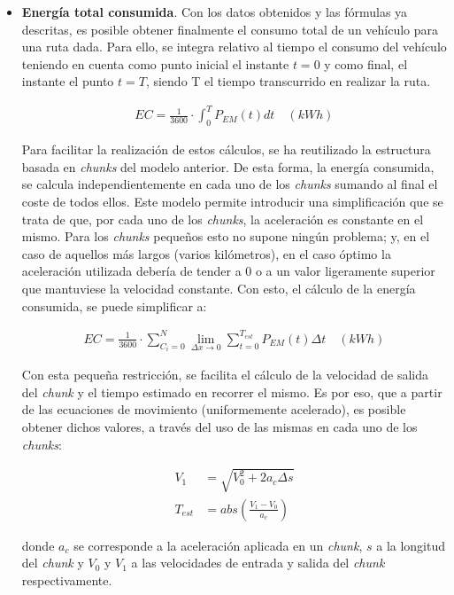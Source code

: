 \documentclass[11pt,spanish,listoffigures,listoftables]{tfgetsinf}
\begin{document}
\begin{itemize}
    \item \textbf{Energía total consumida}. Con los datos obtenidos y las fórmulas ya descritas, es posible obtener finalmente el consumo total de un vehículo para una ruta dada. Para ello, se integra relativo al tiempo el consumo del vehículo teniendo en cuenta como punto inicial el instante $t=0$ y como final, el instante el punto $t=T$, siendo T el tiempo transcurrido en realizar la ruta.
    
    \begin{align}
        EC = \frac{1}{3600} \cdot \int_{0}^{T}{P_{EM}(t)dt} \quad(kWh)
    \end{align}
    
    Para facilitar la realización de estos cálculos, se ha reutilizado la estructura basada en \textit{chunks} del modelo anterior. De esta forma, la energía consumida, se calcula independientemente en cada uno de los \textit{chunks} sumando al final el coste de todos ellos. Este modelo permite introducir una simplificación que se trata de que, por cada uno de los \textit{chunks}, la aceleración es constante en el mismo. Para los \textit{chunks} pequeños esto no supone ningún problema; y, en el caso de aquellos más largos (varios kilómetros), en el caso óptimo la aceleración utilizada debería de tender a 0 o a un valor ligeramente superior que mantuviese la velocidad constante. Con esto, el cálculo de la energía consumida, se puede simplificar a:
    
    \begin{align}
        EC = \frac{1}{3600} \cdot \sum_{C_i=0}^{N} \lim_{\Delta x\to0} \sum_{t=0}^{T_{est}}{P_{EM}(t)\Delta t} \quad(kWh)
    \end{align}
    
    Con esta pequeña restricción, se facilita el cálculo de la velocidad de salida del \textit{chunk} y el tiempo estimado en recorrer el mismo. Es por eso, que a partir de las ecuaciones de movimiento (uniformemente acelerado), es posible obtener dichos valores, a través del uso de las mismas en cada uno de los \textit{chunks}:
    
    \begin{align}
        V_{1} &= \sqrt{V_{0}^{2} + 2 a_{c} \Delta s} \\
        T_{est} &= abs \left( \frac{V_{1} - V_{0}}{a_{c}} \right)
    \end{align}
    
    donde $a_{c}$ se corresponde a la aceleración aplicada en un \textit{chunk}, $s$ a la longitud del \textit{chunk} y $V_0$ y $V_1$ a las velocidades de entrada y salida del \textit{chunk} respectivamente.
\end{itemize}
\end{document}
